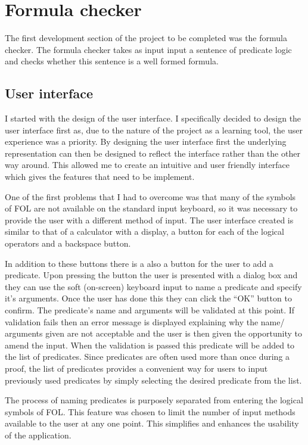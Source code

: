 \chapter{Formula checker}

The first development section of the project to be completed was the formula checker. The formula checker takes as input input a sentence of predicate logic and checks whether this sentence is a well formed formula. 
\section{User interface}
I started with the design of the user interface. I specifically decided to design the user interface first as, due to the nature of the project as a learning tool, the user experience was a priority. By designing the user interface first the underlying representation can then be designed to reflect the interface rather than the other way around. This allowed me to create an intuitive and user friendly interface which gives the features that need to be implement. 

One of the first problems that I had to overcome was that many of the symbols of FOL are not available on the standard input keyboard, so it was necessary to provide the user with a different  method of input. The user interface created is similar to that of a calculator with a display, a button for each of the  logical operators and a backspace button.

In addition to these buttons there is a also a button for the user to add a predicate.	 Upon pressing the button the user is presented with a dialog box and they can use the soft (on-screen) keyboard input to name a predicate and specify it's arguments. Once the user has done this they can click the “OK” button to confirm. The predicate's name and arguments will be validated at this point. If validation fails then an error message is displayed explaining why the name/ arguments given are not acceptable and the user is then given the opportunity to amend the input. When the validation is passed this predicate will be added to the list of predicates. Since predicates are often used more than once during a proof, the list of predicates provides a convenient way for users to input previously used predicates by simply selecting the desired predicate from the list.

The process of naming predicates is purposely separated from entering the logical symbols of FOL. This feature was chosen to limit the number of input methods available to the user at any one point. This simplifies and enhances the usability of the application.

